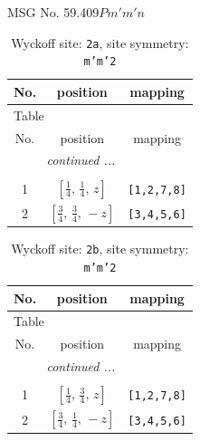 \documentclass[fleqn,8pt]{jsarticle}
\begin{document}
\setcounter{MaxMatrixCols}{32}

\renewcommand{\tablename}{Table~}
\renewcommand{\figurename}{Figure~}
\begin{center}
\LARGE
MSG No. 59.409\quad$Pm'm'n$
\end{center}
\renewcommand{\arraystretch}{1.2}
\begin{longtable}{ccc}
\caption{Wyckoff site: {\tt 2a}, site symmetry: {\tt m'm'2}}
 \\
 \hline \hline
No. & position & mapping \\ \hline \endfirsthead

\multicolumn{2}{l}{\tablename\ \thetable{}} \\
 \hline \hline
No. & position & mapping \\ \hline \endhead

 \hline \hline
\multicolumn{2}{r}{\footnotesize\it continued ...} \\ \endfoot

 \hline \hline
\multicolumn{2}{r}{} \\ \endlastfoot

1 & $\left[ \frac{1}{4},\, \frac{1}{4},\, z \right]$ & {\tt [1,2,7,8]} \\ \hline
2 & $\left[ \frac{3}{4},\, \frac{3}{4},\, - z \right]$ & {\tt [3,4,5,6]} \\
\end{longtable}
\renewcommand{\arraystretch}{1.2}
\begin{longtable}{ccc}
\caption{Wyckoff site: {\tt 2b}, site symmetry: {\tt m'm'2}}
 \\
 \hline \hline
No. & position & mapping \\ \hline \endfirsthead

\multicolumn{2}{l}{\tablename\ \thetable{}} \\
 \hline \hline
No. & position & mapping \\ \hline \endhead

 \hline \hline
\multicolumn{2}{r}{\footnotesize\it continued ...} \\ \endfoot

 \hline \hline
\multicolumn{2}{r}{} \\ \endlastfoot

1 & $\left[ \frac{1}{4},\, \frac{3}{4},\, z \right]$ & {\tt [1,2,7,8]} \\ \hline
2 & $\left[ \frac{3}{4},\, \frac{1}{4},\, - z \right]$ & {\tt [3,4,5,6]} \\
\end{longtable}
\end{document}
